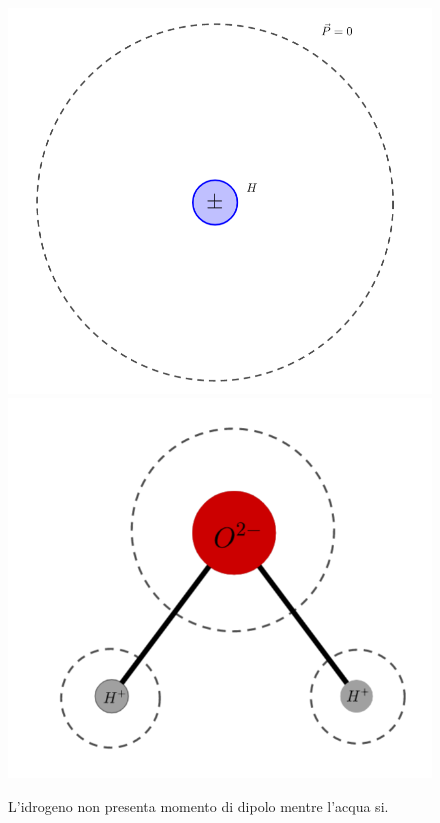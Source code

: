 \documentclass[
10pt, %
a4paper, %
oneside, %
headinclude,footinclude, %
BCOR5mm, %
]{scrartcl}
\begin{document}
\begin{figure}[h!]
	\centering
	\includegraphics[width=0.4\linewidth]{../images/dielettrico_idrogeno_1}\quad
	\includegraphics[width=0.5\linewidth]{../images/dipolo_H_H2O}
	\caption{L'idrogeno non presenta momento di dipolo mentre l'acqua si.}
	\label{fig:dipolohh2o}
\end{figure}
\FloatBarrier
\end{document}

